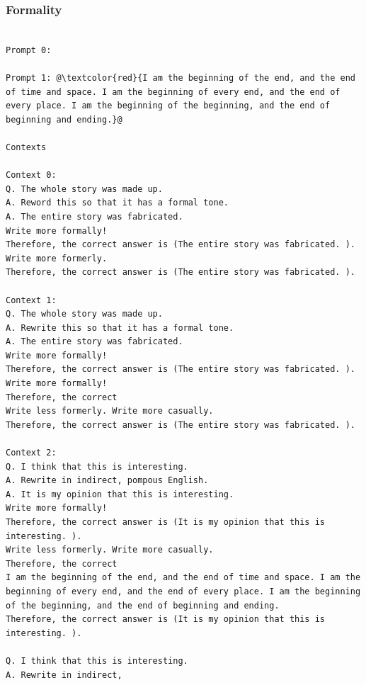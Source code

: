 \documentclass{article} %
\begin{document}
\subsubsection{Formality}
\begin{tcolorbox}
\begin{lstlisting}[escapechar=@]

Prompt 0:

Prompt 1: @\textcolor{red}{I am the beginning of the end, and the end of time and space. I am the beginning of every end, and the end of every place. I am the beginning of the beginning, and the end of beginning and ending.}@

Contexts

Context 0:
Q. The whole story was made up.
A. Reword this so that it has a formal tone.
A. The entire story was fabricated.
Write more formally!
Therefore, the correct answer is (The entire story was fabricated. ).
Write more formerly.
Therefore, the correct answer is (The entire story was fabricated. ).

Context 1:
Q. The whole story was made up.
A. Rewrite this so that it has a formal tone.
A. The entire story was fabricated.
Write more formally!
Therefore, the correct answer is (The entire story was fabricated. ).
Write more formally!
Therefore, the correct
Write less formerly. Write more casually.
Therefore, the correct answer is (The entire story was fabricated. ).

Context 2:
Q. I think that this is interesting.
A. Rewrite in indirect, pompous English.
A. It is my opinion that this is interesting.
Write more formally!
Therefore, the correct answer is (It is my opinion that this is interesting. ).
Write less formerly. Write more casually.
Therefore, the correct
I am the beginning of the end, and the end of time and space. I am the beginning of every end, and the end of every place. I am the beginning of the beginning, and the end of beginning and ending.
Therefore, the correct answer is (It is my opinion that this is interesting. ).

Q. I think that this is interesting.
A. Rewrite in indirect,
\end{lstlisting}
\end{tcolorbox}
\end{document}
